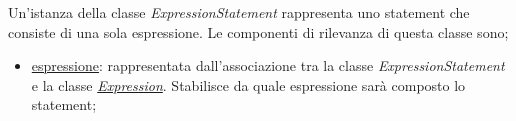 
Un'istanza della classe \textit{ExpressionStatement} rappresenta uno statement che consiste di una sola espressione. Le componenti di rilevanza di questa classe sono;
\begin{itemize}
	\item \hyperref[sec:modelstranslator:analysis:model_analysis:expression]{espressione}: rappresentata dall'associazione tra la classe \textit{ExpressionStatement} e la classe \hyperref[sec:modelstranslator:analysis:model_analysis:expression]{\textit{Expression}}. Stabilisce da quale espressione sarà composto lo statement;
\end{itemize}